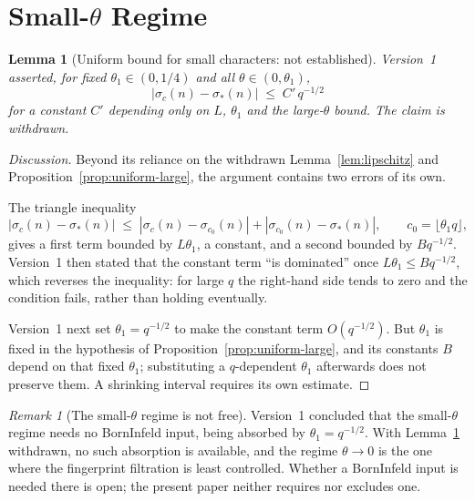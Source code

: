 \documentclass[12pt,a4paper]{article}
\newtheorem{lemma}[theorem]{Lemma}
\theoremstyle{definition}
\theoremstyle{remark}
\newtheorem{remark}[theorem]{Remark}
\begin{document}
  \section{Small-$\theta$ Regime}\label{sec:smalltheta}

    \begin{lemma}[Uniform bound for small characters: not established]\label{lem:smalltheta}
      Version~1 asserted, for fixed $\theta_1 \in (0,1/4)$ and all $\theta \in (0,\theta_1)$,
      \begin{equation}\label{eq:smalltheta}
        |\sigma_c(n) - \sigma_*(n)| \;\leq\; C'\,q^{-1/2}
      \end{equation}
      for a constant $C'$ depending only on $L$, $\theta_1$ and the large-$\theta$ bound.
      The claim is withdrawn.
    \end{lemma}

    \begin{proof}[Discussion]
      Beyond its reliance on the withdrawn Lemma~\ref{lem:lipschitz} and
      Proposition~\ref{prop:uniform-large}, the argument contains two errors of its own.

      The triangle inequality
      \begin{equation}\label{eq:triangle}
        |\sigma_c(n) - \sigma_*(n)|
        \;\leq\; |\sigma_c(n) - \sigma_{c_0}(n)| + |\sigma_{c_0}(n) - \sigma_*(n)|,
        \qquad c_0 = \lfloor\theta_1 q\rfloor,
      \end{equation}
      gives a first term bounded by $L\theta_1$, a constant, and a second bounded by
      $Bq^{-1/2}$.
      Version~1 then stated that the constant term ``is dominated'' once
      $L\theta_1 \leq Bq^{-1/2}$, which reverses the inequality: for large $q$ the right-hand
      side tends to zero and the condition fails, rather than holding eventually.

      Version~1 next set $\theta_1 = q^{-1/2}$ to make the constant term $O(q^{-1/2})$.
      But $\theta_1$ is fixed in the hypothesis of Proposition~\ref{prop:uniform-large}, and
      its constants $B$ depend on that fixed $\theta_1$; substituting a $q$-dependent
      $\theta_1$ afterwards does not preserve them.
      A shrinking interval requires its own estimate.
    \end{proof}

    \begin{remark}[The small-$\theta$ regime is not free]\label{rem:no-BI}
      Version~1 concluded that the small-$\theta$ regime needs no Born\textendash Infeld
      input, being absorbed by $\theta_1 = q^{-1/2}$.
      With Lemma~\ref{lem:smalltheta} withdrawn, no such absorption is available, and the
      regime $\theta \to 0$ is the one where the fingerprint filtration is least controlled.
      Whether a Born\textendash Infeld input is needed there is open; the present paper
      neither requires nor excludes one.
    \end{remark}
\end{document}
